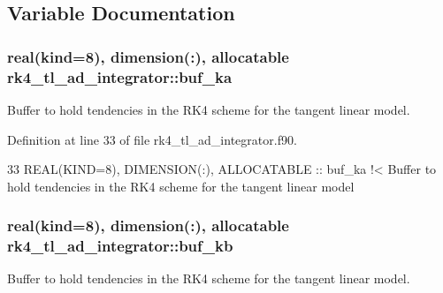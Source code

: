 \subsection{Variable Documentation}
\subsubsection[{\texorpdfstring{buf\+\_\+ka}{buf_ka}}]{\setlength{\rightskip}{0pt plus 5cm}real(kind=8), dimension(\+:), allocatable rk4\+\_\+tl\+\_\+ad\+\_\+integrator\+::buf\+\_\+ka\hspace{0.3cm}{\ttfamily [private]}}\hypertarget{namespacerk4__tl__ad__integrator_a076c0ff20536d9911a40c81565a0ba25}{}\label{namespacerk4__tl__ad__integrator_a076c0ff20536d9911a40c81565a0ba25}


Buffer to hold tendencies in the R\+K4 scheme for the tangent linear model. 



Definition at line 33 of file rk4\+\_\+tl\+\_\+ad\+\_\+integrator.\+f90.


\begin{DoxyCode}
33   \textcolor{keywordtype}{REAL(KIND=8)}, \textcolor{keywordtype}{DIMENSION(:)}, \textcolor{keywordtype}{ALLOCATABLE} :: buf\_ka\textcolor{comment}{ !< Buffer to hold tendencies in the RK4 scheme for the
       tangent linear model}
\end{DoxyCode}
\subsubsection[{\texorpdfstring{buf\+\_\+kb}{buf_kb}}]{\setlength{\rightskip}{0pt plus 5cm}real(kind=8), dimension(\+:), allocatable rk4\+\_\+tl\+\_\+ad\+\_\+integrator\+::buf\+\_\+kb\hspace{0.3cm}{\ttfamily [private]}}\hypertarget{namespacerk4__tl__ad__integrator_aed1e8c65a9882bdc18b4634fee0656f1}{}\label{namespacerk4__tl__ad__integrator_aed1e8c65a9882bdc18b4634fee0656f1}


Buffer to hold tendencies in the R\+K4 scheme for the tangent linear model. 



